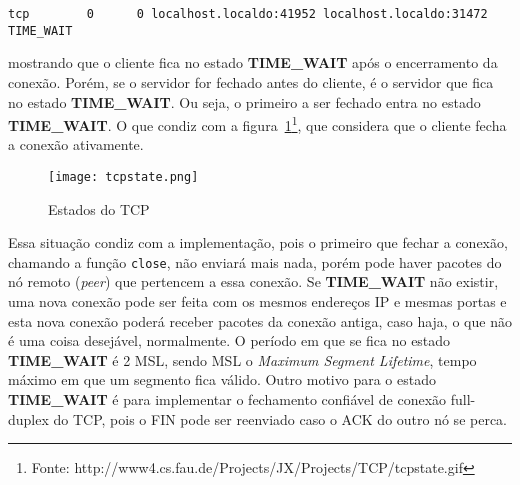 \documentclass[a4paper,10pt]{article}
\begin{document}
\begin{lstlisting}
tcp        0      0 localhost.localdo:41952 localhost.localdo:31472 TIME_WAIT
\end{lstlisting}

mostrando que o cliente fica no estado \textbf{TIME\_WAIT} após o encerramento da conexão.
Porém, se o servidor for fechado antes do cliente, é o servidor que fica no estado \textbf{TIME\_WAIT}. Ou seja, o primeiro a ser fechado entra no estado \textbf{TIME\_WAIT}.
O que condiz com a figura~\ref{fig:tcpstates}\footnote{Fonte: http://www4.cs.fau.de/Projects/JX/Projects/TCP/tcpstate.gif}, que considera que o cliente fecha a conexão ativamente.

\begin{figure}[htb]
    \begin{center}
	\texttt{[image: tcpstate.png]}
	\caption{Estados do TCP}
	\label{fig:tcpstates}
	\end{center}
\end{figure}

Essa situação condiz com a implementação, pois o primeiro que fechar a conexão, chamando a função {\tt close}, não enviará mais nada, porém pode haver pacotes do nó remoto (\textit{peer}) que pertencem a essa conexão. Se \textbf{TIME\_WAIT} não existir, uma nova conexão pode ser feita com os mesmos endereços IP e mesmas portas e esta nova conexão poderá receber pacotes da conexão antiga, caso haja, o que não é uma coisa desejável, normalmente. O período em que se fica no estado \textbf{TIME\_WAIT} é 2 MSL, sendo MSL o \textit{Maximum Segment Lifetime}, tempo máximo em que um segmento fica válido. Outro motivo para o estado \textbf{TIME\_WAIT} é para implementar o fechamento confiável de conexão full-duplex do TCP, pois o FIN pode ser reenviado caso o ACK do outro nó se perca.
\end{document}
